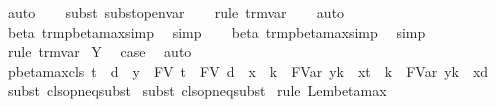 \begin{isabellebody}
\ auto{\isacharbrackleft}{}{\isacharbrackright}\isanewline
\ \ \isamarkupfalse%
\ {\isacharparenleft}subst\ subst{\isacharunderscore}open{\isacharunderscore}var{}{\isacharparenright}\isanewline
\ \ \isamarkupfalse%
\ {\isacharparenleft}rule\ trm{\isachardot}var{\isacharparenright}\isanewline
\ \ \isamarkupfalse%
\ auto{\isacharbrackleft}{}{\isacharbrackright}\isanewline
\ \ \isamarkupfalse%
\ beta\ trm{\isacharunderscore}pbeta{\isacharunderscore}max{\isacharunderscore}simp{}\ \isamarkupfalse%
\ simp\isanewline
\ \ \isamarkupfalse%
\ beta\ trm{\isacharunderscore}pbeta{\isacharunderscore}max{\isacharunderscore}simp{}\ \isamarkupfalse%
\ simp\isanewline
\ \ \isamarkupfalse%
\ {\isacharparenleft}rule\ trm{\isachardot}var{\isacharparenright}\isanewline
{}\isamarkupfalse%
\isanewline
{}\isamarkupfalse%
\ Y\ \isamarkupfalse%
\ {\isacharquery}case\ \isamarkupfalse%
\ auto\isanewline
{}\isamarkupfalse%
%
\endisatagproof
{\isafoldproof}%
%
\isadelimproof
\isanewline
%
\endisadelimproof
\isanewline
{}\isamarkupfalse%
\ pbeta{\isacharunderscore}max{\isacharunderscore}cls{\isacharcolon}\ {\isachardoublequoteopen}t\ {\isachargreater}{\isachargreater}{\isachargreater}\ d\ {\isasymLongrightarrow}\ y\ {\isasymnotin}\ FV\ t\ {\isasymunion}\ FV\ d\ {\isasymunion}\ {\isacharbraceleft}x{\isacharbraceright}\ {\isasymLongrightarrow}\ {\isacharbraceleft}k\ {\isasymrightarrow}\ FVar\ y{\isacharbraceright}{\isacharbraceleft}k\ {\isacharless}{\isacharminus}\ x{\isacharbraceright}t\ {\isachargreater}{\isachargreater}{\isachargreater}\ {\isacharbraceleft}k\ {\isasymrightarrow}\ FVar\ y{\isacharbraceright}{\isacharbraceleft}k\ {\isacharless}{\isacharminus}\ x{\isacharbraceright}d{\isachardoublequoteclose}\isanewline
%
\isadelimproof
%
\endisadelimproof
%
\isatagproof
{}\isamarkupfalse%
\ {\isacharparenleft}subst\ cls{\isacharunderscore}opn{\isacharunderscore}eq{\isacharunderscore}subst{\isacharparenright}\isanewline
{}\isamarkupfalse%
\isanewline
{}\isamarkupfalse%
\ {\isacharparenleft}subst\ cls{\isacharunderscore}opn{\isacharunderscore}eq{\isacharunderscore}subst{\isacharparenright}\isanewline
{}\isamarkupfalse%
\isanewline
{}\isamarkupfalse%
\ {\isacharparenleft}rule\ Lem{}{\isacharunderscore}{}{\isacharunderscore}{}{\isacharunderscore}beta{\isacharunderscore}max{\isacharparenright}\isanewline

\end{isabellebody}
